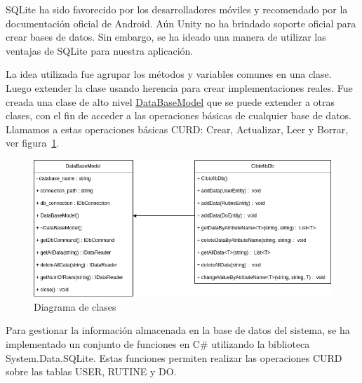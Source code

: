 SQLite ha sido favorecido por los desarrolladores móviles y recomendado por la documentación oficial de Android. Aún Unity no ha brindado soporte oficial para crear bases de datos. Sin embargo, se ha ideado una manera de utilizar las ventajas de SQLite para nuestra aplicación.

La idea utilizada fue agrupar los métodos y variables comunes en una clase. Luego extender la clase usando herencia para crear implementaciones reales. Fue creada una clase de alto nivel \underline{DataBaseModel}  que se puede extender a otras clases, con el fin de acceder a las operaciones básicas de cualquier base de datos. Llamamos a estas operaciones básicas CURD: Crear, Actualizar, Leer y Borrar, ver figura~\ref{fig: diagram-db}.

\begin{figure}[ht]
    \centering
    \includegraphics[scale=0.6]{images/diagram-db.png}
    \caption{Diagrama de clases}
    \label{fig: diagram-db}
\end{figure}

Para gestionar la información almacenada en la base de datos del sistema, se ha implementado un conjunto de funciones en C\# utilizando la biblioteca System.Data.SQLite. Estas funciones permiten realizar las operaciones CURD sobre las tablas USER, RUTINE y DO.

